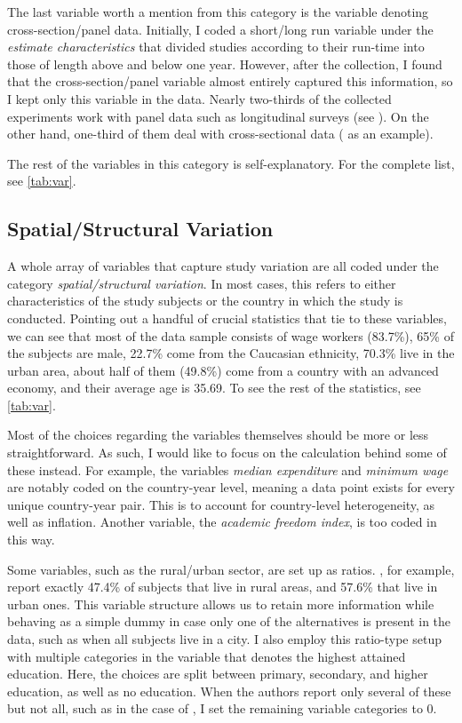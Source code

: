 The last variable worth a mention from this category is the variable denoting cross-section/panel data. Initially, I coded a short/long run variable under the \textit{estimate characteristics} that divided studies according to their run-time into those of length above and below one year. However, after the collection, I found that the cross-section/panel variable almost entirely captured this information, so I kept only this variable in the data. Nearly two-thirds of the collected experiments work with panel data such as longitudinal surveys (see \cite{harmon2003returns}). On the other hand, one-third of them deal with cross-sectional data (\cite{lemieux2001education} as an example).

The rest of the variables in this category is self-explanatory. For the complete list, see \autoref{tab:var}.

\subsection{Spatial/Structural Variation}
\label{subsec:spat_str_variation}

A whole array of variables that capture study variation are all coded under the category \textit{spatial/structural variation}. In most cases, this refers to either characteristics of the study subjects or the country in which the study is conducted. Pointing out a handful of crucial statistics that tie to these variables, we can see that most of the data sample consists of wage workers (83.7\%), 65\% of the subjects are male, 22.7\% come from the Caucasian ethnicity, 70.3\% live in the urban area, about half of them (49.8\%) come from a country with an advanced economy, and their average age is 35.69. To see the rest of the statistics, see \autoref{tab:var}.

Most of the choices regarding the variables themselves should be more or less straightforward. As such, I would like to focus on the calculation behind some of these instead. For example, the variables \textit{median expenditure} and \textit{minimum wage} are notably coded on the country-year level, meaning a data point exists for every unique country-year pair. This is to account for country-level heterogeneity, as well as inflation. Another variable, the \textit{academic freedom index}, is too coded in this way.

Some variables, such as the rural/urban sector, are set up as ratios. \cite{paweenawat2015private}, for example, report exactly 47.4\% of subjects that live in rural areas, and 57.6\% that live in urban ones. This variable structure allows us to retain more information while behaving as a simple dummy in case only one of the alternatives is present in the data, such as when all subjects live in a city. I also employ this ratio-type setup with multiple categories in the variable that denotes the highest attained education. Here, the choices are split between primary, secondary, and higher education, as well as no education. When the authors report only several of these but not all, such as in the case of \cite{chanis2021tell}, I set the remaining variable categories to 0.

